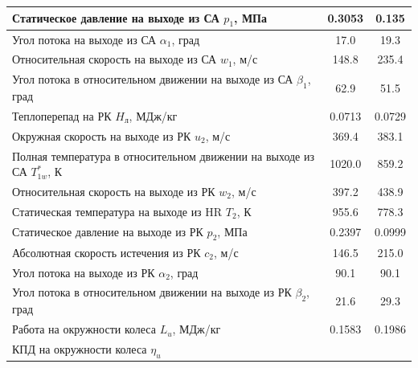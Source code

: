 \documentclass[a4paper,12pt]{article}
\begin{document}
\begin{longtable}{
    |p{8cm}|
%    
    c|
%    
    c|
%    
    }
%        
        \\ \hline
        Статическое давление на выходе из СА $p_1$, МПа
%        
        & 0.3053
%        
        & 0.135
%        
        \\ \hline
        Угол потока на выходе из СА $\alpha_1$, град
%        
        & 17.0
%        
        & 19.3
%        
        \\ \hline
        Относительная скорость на выходе из СА $w_1$, м/с
%        
        & 148.8
%        
        & 235.4
%        
        \\ \hline
        Угол потока в относительном движении на выходе из СА $\beta_1$, град
%        
        & 62.9
%        
        & 51.5
%        
        \\ \hline
        Теплоперепад на РК $H_л$, МДж/кг
%        
        & 0.0713
%        
        & 0.0729
%        
        \\ \hline
        Окружная скорость на выходе из РК $u_2$, м/с
%        
        & 369.4
%        
        & 383.1
%        
        \\ \hline
        Полная температура в относительном движении на выходе из СА $T_{1w}^*$, К
%        
        & 1020.0
%        
        & 859.2
%        
        \\ \hline
        Относительная скорость на выходе из РК $w_2$, м/с
%        
        & 397.2
%        
        & 438.9
%        
        \\ \hline
        Статическая температура на выходе из HR $T_2$, К
%        
        & 955.6
%        
        & 778.3
%        
        \\ \hline
        Статическое давление на выходе из РК $p_2$, МПа
%        
        & 0.2397
%        
        & 0.0999
%        
        \\ \hline
        Абсолютная скорость истечения из РК $c_2$, м/с
%        
        & 146.5
%        
        & 215.0
%        
        \\ \hline
        Угол потока на выходе из РК $\alpha_2$, град
%        
        & 90.1
%        
        & 90.1
%        
        \\ \hline
        Угол потока в относительном движении на выходе из РК $\beta_2$, град
%        
        & 21.6
%        
        & 29.3
%        
        \\ \hline
        Работа на окружности колеса $L_u$, МДж/кг
%        
        & 0.1583
%        
        & 0.1986
%        
        \\ \hline
        КПД на окружности колеса $\eta_u$

\end{longtable}
\end{document}
